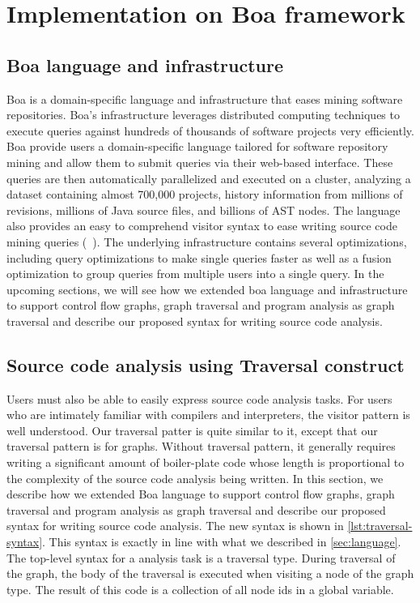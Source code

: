 \chapter{Implementation on Boa framework}
\label{sec:impl}

\section{Boa language and infrastructure}
Boa is a domain-specific language and infrastructure that eases mining software repositories. Boa's infrastructure leverages distributed computing techniques to execute queries against hundreds of thousands of software projects very efficiently. Boa provide users a
domain-specific language tailored for software repository mining and allow them to submit queries via
their web-based interface. These queries are then automatically parallelized and executed on a cluster,
analyzing a dataset containing almost 700,000 projects, history information from millions of revisions,
millions of Java source files, and billions of AST nodes. The language also provides an easy to comprehend
visitor syntax to ease writing source code mining queries (~\cite{dyer2013declarative}). The underlying infrastructure contains
several optimizations, including query optimizations to make single queries faster as well as a fusion
optimization to group queries from multiple users into a single query. In the upcoming sections, we will see how we extended boa language and infrastructure to support control flow graphs, graph traversal and program analysis as graph traversal and describe our proposed syntax for writing source code analysis.

\section{Source code analysis using Traversal construct}
Users must also be able to easily express source code analysis tasks. For users who are intimately
familiar with compilers and interpreters, the visitor pattern is well understood. Our traversal patter is quite similar to it, except that our traversal pattern is for graphs. Without traversal pattern, it generally requires writing a
significant amount of boiler-plate code whose length is proportional to the complexity of the source code analysis being written.
In this section, we describe how we extended Boa language to support control flow graphs, graph traversal and program analysis as graph traversal and describe our proposed syntax for writing source code analysis. 
The new syntax is shown in \ref{lst:traversal-syntax}. This syntax is exactly in line with what we described in \ref{sec:language}. The top-level syntax for a analysis task is a traversal type. During traversal of the graph, the body of the traversal is executed when visiting a node of the graph type. The result of this code is a collection of all node ids in a global variable.

